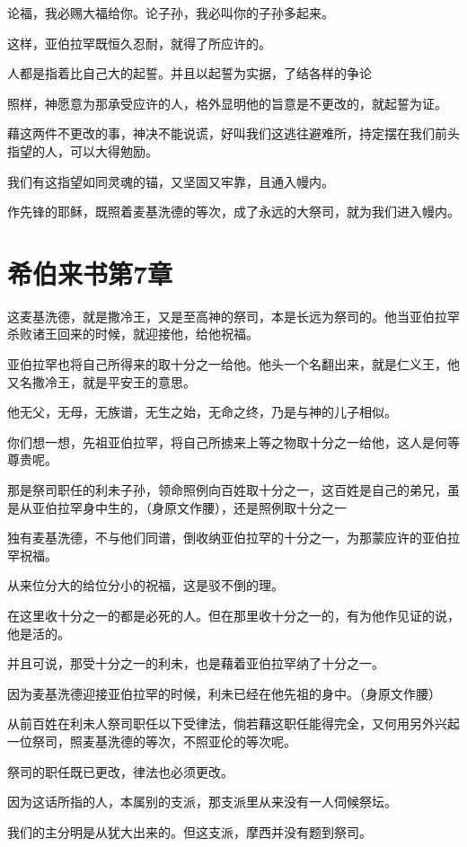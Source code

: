 \documentclass[12pt,oneside]{book}
\begin{document}
论福，我必赐大福给你。论子孙，我必叫你的子孙多起来。

这样，亚伯拉罕既恒久忍耐，就得了所应许的。

人都是指着比自己大的起誓。并且以起誓为实据，了结各样的争论

照样，神愿意为那承受应许的人，格外显明他的旨意是不更改的，就起誓为证。

藉这两件不更改的事，神决不能说谎，好叫我们这逃往避难所，持定摆在我们前头指望的人，可以大得勉励。

我们有这指望如同灵魂的锚，又坚固又牢靠，且通入幔内。

作先锋的耶稣，既照着麦基洗德的等次，成了永远的大祭司，就为我们进入幔内。

\chapter{希伯来书第7章}
这麦基洗德，就是撒冷王，又是至高神的祭司，本是长远为祭司的。他当亚伯拉罕杀败诸王回来的时候，就迎接他，给他祝福。

亚伯拉罕也将自己所得来的取十分之一给他。他头一个名翻出来，就是仁义王，他又名撒冷王，就是平安王的意思。

他无父，无母，无族谱，无生之始，无命之终，乃是与神的儿子相似。

你们想一想，先祖亚伯拉罕，将自己所掳来上等之物取十分之一给他，这人是何等尊贵呢。

那是祭司职任的利未子孙，领命照例向百姓取十分之一，这百姓是自己的弟兄，虽是从亚伯拉罕身中生的，（身原文作腰），还是照例取十分之一

独有麦基洗德，不与他们同谱，倒收纳亚伯拉罕的十分之一，为那蒙应许的亚伯拉罕祝福。

从来位分大的给位分小的祝福，这是驳不倒的理。

在这里收十分之一的都是必死的人。但在那里收十分之一的，有为他作见证的说，他是活的。

并且可说，那受十分之一的利未，也是藉着亚伯拉罕纳了十分之一。

因为麦基洗德迎接亚伯拉罕的时候，利未已经在他先祖的身中。（身原文作腰）

从前百姓在利未人祭司职任以下受律法，倘若藉这职任能得完全，又何用另外兴起一位祭司，照麦基洗德的等次，不照亚伦的等次呢。

祭司的职任既已更改，律法也必须更改。

因为这话所指的人，本属别的支派，那支派里从来没有一人伺候祭坛。

我们的主分明是从犹大出来的。但这支派，摩西并没有题到祭司。
\end{document}
